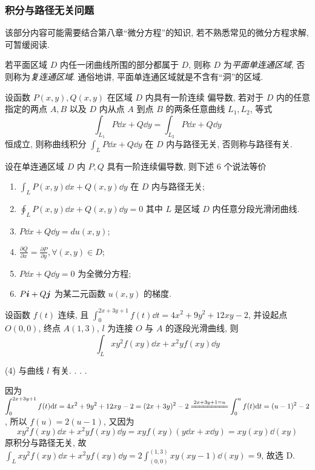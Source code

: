 \subsubsection{积分与路径无关问题}

该部分内容可能需要结合第八章“微分方程”的知识, 若不熟悉常见的微分方程求解, 可暂缓阅读.

\begin{definition}[单连通与复连通区域]
    若平面区域 $ D $ 内任一闭曲线所围的部分都属于 $D$, 则称 $ D $ 为\textit{平面单连通区域}, 否则称为\textit{复连通区域}. 通俗地讲, 平面单连通区域就是不含有“洞”的区域.
\end{definition}

\begin{theorem}[路径无关]
    设函数 $ P(x, y), Q(x, y) $ 在区域 $ D $ 内具有一阶连续 偏导数, 若对于 $ D $ 内的任意指定的两点  $A, B$  以及 $ D $ 内从点  $A$  到点 $ B$  的两条任意曲线 $ L_{1}, L_{2}$, 等式
    $$\int_{L_{1}} P \dd  x+Q \dd  y=\int_{L_{2}} P \dd  x+Q \dd  y$$
    恒成立, 则称曲线积分 $ \displaystyle\int_{L} P \dd  x+Q \dd  y $ 在 $ D $ 内与路径无关, 否则称与路径有关.
\end{theorem}

设在单连通区域 $ D $ 内 $ P, Q $ 具有一阶连续偏导数, 则下述 6 个说法等价
\begin{enumerate}[label=(\arabic{*})]
    \item $\displaystyle\int_{L} P(x, y) \dd  x+Q(x, y) \dd  y $ 在 $ D $ 内与路径无关;
    \item $\displaystyle \oint_{L} P(x, y) \dd  x+Q(x, y) \dd  y=0 $
          其中 $ L $ 是区域 $ D $ 内任意分段光滑闭曲线.
    \item $P \dd  x+Q \dd  y=d u(x, y)$;
    \item $\displaystyle\frac{\partial Q}{\partial x}=\frac{\partial P}{\partial y}, \forall(x, y) \in D $;
    \item $P \dd  x+Q \dd  y=0 $ 为全微分方程;
    \item $P \vb*{i}+Q \vb*{j}$ 为某二元函数 $ u(x, y) $ 的梯度.
\end{enumerate}

\begin{example}
    设函数 $f(t)$ 连续, 且 $ \displaystyle \int_{0}^{2x+3y+1} f(t) \dd t =4x^2+9y^2+12xy-2$, 并设起点 $O(0,0)$, 终点 $A(1,3)$, $l$ 为连接 $O$ 与 $A$ 的逐段光滑曲线, 则
    $$
    \int_L xy^2f(xy)\dd x+x^2y f(xy)\dd y
    $$
    \begin{tasks}(4)
        \task 与曲线 $l$ 有关.
        .
        .
        .
    \end{tasks}
\end{example}
\begin{solution}
    因为 $ \displaystyle \int_{0}^{2x+3y+1} f(t) \dd t =4x^2+9y^2+12xy-2=(2x+3y)^2-2\xlongequal{2x+3y+1=u}\int_{0}^{u} f(t) \dd t=(u-1)^2-2$, 所以 $f(u)=2(u-1)$, 又因为 
    $$
    xy^2f(xy)\dd x+x^2y f(xy)\dd y=xyf(xy)(y \dd x + x \dd y)=xy(xy)\dd (xy)
    $$
    原积分与路径无关, 故 $\displaystyle \int_L xy^2f(xy)\dd x+x^2y f(xy)\dd y=2\int_{(0,0)}^{(1,3)} xy(xy-1) \dd (xy)=9$, 故选 D.
\end{solution}

